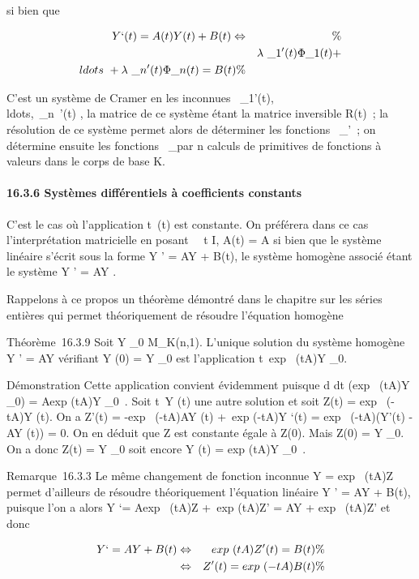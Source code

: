 \documentclass[]{article}
\begin{document}
si bien que

\begin{align*} Y `(t) = A(t)Y (t) + B(t)
\Leftrightarrow&& \%& \\
& & \lambda~\_1'(t)\Phi\_1(t) +
\\ldots~ +
\lambda~\_n'(t)\Phi\_n(t) = B(t)\%&
\\ \end{align*}

C'est un système de Cramer en les inconnues
\lambda~\_1'(t),\\ldots,\lambda~\_n~'(t)
, la matrice de ce système étant la matrice inversible R(t)~; la
résolution de ce système permet alors de déterminer les fonctions
\lambda~\_\jmath'~; on détermine ensuite les fonctions \lambda~\_\jmath par n
calculs de primitives de fonctions à valeurs dans le corps de base K.

\paragraph{16.3.6 Systèmes différentiels à coefficients constants}

C'est le cas où l'application t\mapsto~\ell(t) est
constante. On préférera dans ce cas l'interprétation matricielle en
posant \forall~~t \in I, A(t) = A si bien que le système
linéaire s'écrit sous la forme Y ' = AY + B(t), le système homogène
associé étant le système Y ' = AY .

Rappelons à ce propos un théorème démontré dans le chapitre sur les
séries entières qui permet théoriquement de résoudre l'équation homogène

Théorème~16.3.9 Soit Y \_0 \in M\_K(n,1). L'unique
solution du système homogène Y ' = AY vérifiant Y (0) = Y \_0
est l'application
t\mapsto~exp~ (tA)Y
\_0.

Démonstration Cette application convient évidemment puisque  d
\over dt (exp~ (tA)Y
\_0) = Aexp (tA)Y \_0~. Soit
t\mapsto~Y (t) une autre solution et soit Z(t)
= exp~ (-tA)Y (t). On a Z'(t) =
-exp~ (-tA)AY (t) +\
exp (-tA)Y `(t) = exp~ (-tA)(Y'(t) - AY (t))
= 0. On en déduit que Z est constante égale à Z(0). Mais Z(0) = Y
\_0. On a donc Z(t) = Y \_0 soit encore Y (t)
= exp (tA)Y \_0~.

Remarque~16.3.3 Le même changement de fonction inconnue Y
= exp~ (tA)Z permet d'ailleurs de résoudre
théoriquement l'équation linéaire Y ' = AY + B(t), puisque l'on a alors
Y `= Aexp~ (tA)Z +\
exp (tA)Z' = AY + exp~ (tA)Z' et donc

\begin{align*} Y `= AY + B(t)&
\Leftrightarrow & exp~ (tA)Z'(t)
= B(t) \%& \\ &
\Leftrightarrow & Z'(t) = exp~
(-tA)B(t)\%& \\
\end{align*}
\end{document}
